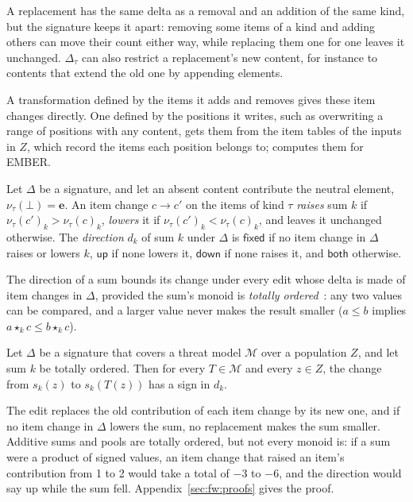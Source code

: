 \noindent A replacement has the same delta as a removal and an addition of the same kind, but the signature keeps it
apart: removing some items of a kind and adding others can move their count either way, while replacing them one for
one leaves it unchanged. $\Delta_\tau$ can also restrict a replacement's new content, for instance to contents that
extend the old one by appending elements.

A transformation defined by the items it adds and removes gives these item changes directly. One defined by the
positions it writes, such as overwriting a range of positions with any content, gets them from the item tables of the
inputs in $Z$, which record the items each position belongs to;  computes them for EMBER.

\label{def:fw:sum-direction}
{
Let $\Delta$ be a signature, and let an absent content contribute the neutral element, $\nu_\tau(\bot) = \mathbf{e}$.
An item change $c \to c'$ on the items of kind $\tau$ \emph{raises} sum $k$ if $\nu_\tau(c')_k > \nu_\tau(c)_k$,
\emph{lowers} it if $\nu_\tau(c')_k < \nu_\tau(c)_k$, and leaves it unchanged otherwise. The \emph{direction} $d_k$ of
sum $k$ under $\Delta$ is $\mathsf{fixed}$ if no item change in $\Delta$ raises or lowers $k$, $\mathsf{up}$ if none lowers
it, $\mathsf{down}$ if none raises it, and $\mathsf{both}$ otherwise.
}

\noindent The direction of a sum bounds its change under every edit whose delta is made of item changes in $\Delta$,
provided the sum's monoid is \emph{totally ordered}~\cite{fuchs1963partially}: any two values can be compared, and a
larger value never makes the result smaller ($a \le b$ implies $a \star_k c \le b \star_k c$).

\label{lem:fw:sum-direction}
{
Let $\Delta$ be a signature that covers a threat model $\mathcal{M}$ over a population $Z$, and let sum $k$ be totally
ordered. Then for every $T \in \mathcal{M}$ and every $z \in Z$, the change from $s_k(z)$ to $s_k(T(z))$ has a sign
in $d_k$.
}

\noindent The edit replaces the old contribution of each item change by its new one, and if no item change in
$\Delta$ lowers the sum, no replacement makes the sum smaller. Additive sums and pools are totally ordered, but not
every monoid is: if a sum were a
product of signed values, an item change that raised an item's contribution from 1 to 2 would take a total of $-3$ to
$-6$, and the direction would say up while the sum fell. Appendix~\ref{sec:fw:proofs} gives the proof.

